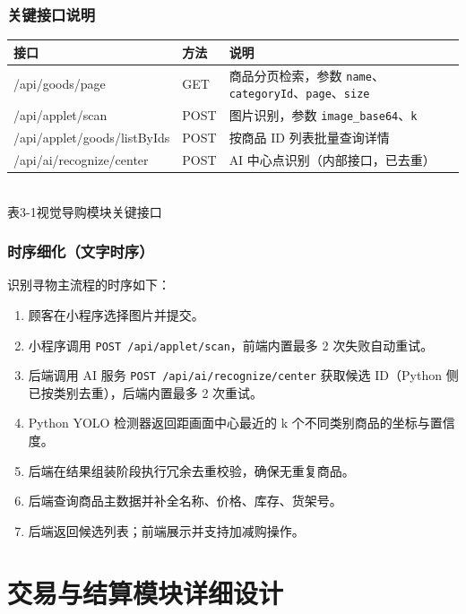 \subsubsection{关键接口说明}
\begin{center}
  \renewcommand{\arraystretch}{1.35}
  \begin{tabular}{|>{\centering\arraybackslash}m{3.6cm}|>{\centering\arraybackslash}m{2.2cm}|>{\centering\arraybackslash}m{6.4cm}|}
    \hline
    \textbf{接口} & \textbf{方法} & \textbf{说明} \\ \hline
    /api/goods/page & GET & 商品分页检索，参数 \texttt{name}、\texttt{categoryId}、\texttt{page}、\texttt{size} \\ \hline
    /api/applet/scan & POST & 图片识别，参数 \texttt{image\_base64}、\texttt{k} \\ \hline
    /api/applet/goods/listByIds & POST & 按商品 ID 列表批量查询详情 \\ \hline
    /api/ai/recognize/center & POST & AI 中心点识别（内部接口，已去重） \\ \hline
  \end{tabular}
  \\[0.3em]
  {表3-1\quad 视觉导购模块关键接口}
\end{center}

\subsubsection{时序细化（文字时序）}
识别寻物主流程的时序如下：
\begin{enumerate}[leftmargin=2em]
  \item 顾客在小程序选择图片并提交。
  \item 小程序调用 \texttt{POST /api/applet/scan}，前端内置最多 2 次失败自动重试。
  \item 后端调用 AI 服务 \texttt{POST /api/ai/recognize/center} 获取候选 ID（Python 侧已按类别去重），后端内置最多 2 次重试。
  \item Python YOLO 检测器返回距画面中心最近的 k 个不同类别商品的坐标与置信度。
  \item 后端在结果组装阶段执行冗余去重校验，确保无重复商品。
  \item 后端查询商品主数据并补全名称、价格、库存、货架号。
  \item 后端返回候选列表；前端展示并支持加减购操作。
\end{enumerate}

\section{交易与结算模块详细设计}

